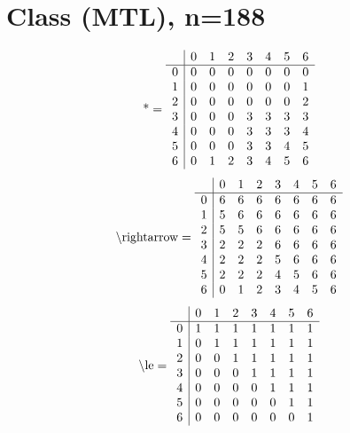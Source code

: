 \documentclass[11pt]{article}
\begin{document}
\section{Class (MTL), n=188}
\[\text{*} = 
\begin{array}{r | r r r r r r r}
 & 0 & 1 & 2 & 3 & 4 & 5 & 6 \\ \hline
0 & 0 & 0 & 0 & 0 & 0 & 0 & 0 \\
1 & 0 & 0 & 0 & 0 & 0 & 0 & 1 \\
2 & 0 & 0 & 0 & 0 & 0 & 0 & 2 \\
3 & 0 & 0 & 0 & 3 & 3 & 3 & 3 \\
4 & 0 & 0 & 0 & 3 & 3 & 3 & 4 \\
5 & 0 & 0 & 0 & 3 & 3 & 4 & 5 \\
6 & 0 & 1 & 2 & 3 & 4 & 5 & 6 \\
\end{array}
\]
\[\text{\textbackslash rightarrow} = 
\begin{array}{r | r r r r r r r}
 & 0 & 1 & 2 & 3 & 4 & 5 & 6 \\ \hline
0 & 6 & 6 & 6 & 6 & 6 & 6 & 6 \\
1 & 5 & 6 & 6 & 6 & 6 & 6 & 6 \\
2 & 5 & 5 & 6 & 6 & 6 & 6 & 6 \\
3 & 2 & 2 & 2 & 6 & 6 & 6 & 6 \\
4 & 2 & 2 & 2 & 5 & 6 & 6 & 6 \\
5 & 2 & 2 & 2 & 4 & 5 & 6 & 6 \\
6 & 0 & 1 & 2 & 3 & 4 & 5 & 6 \\
\end{array}
\]
\[\text{\textbackslash le} = 
\begin{array}{r | r r r r r r r}
 & 0 & 1 & 2 & 3 & 4 & 5 & 6 \\ \hline
0 & 1 & 1 & 1 & 1 & 1 & 1 & 1 \\
1 & 0 & 1 & 1 & 1 & 1 & 1 & 1 \\
2 & 0 & 0 & 1 & 1 & 1 & 1 & 1 \\
3 & 0 & 0 & 0 & 1 & 1 & 1 & 1 \\
4 & 0 & 0 & 0 & 0 & 1 & 1 & 1 \\
5 & 0 & 0 & 0 & 0 & 0 & 1 & 1 \\
6 & 0 & 0 & 0 & 0 & 0 & 0 & 1 \\
\end{array}
\]
\end{document}
